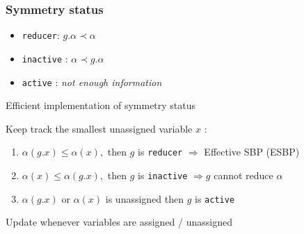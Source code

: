 \documentclass{beamer}
\begin{document}
\begin{frame}
\frametitle{Symmetry status}

\begin{itemize}
	\item \texttt{reducer}: $g.\alpha \prec \alpha$
	\item \texttt{inactive} : $\alpha \prec g.\alpha$
	\item \texttt{active} : \textit{not enough information}
\end{itemize}

\vfill

\begin{block}{Efficient implementation of symmetry status}

\centering 	Keep track the smallest unassigned variable $x$ :

\vspace{1em}

	\begin{enumerate}
		\item $\alpha(g.x) \leq \alpha(x),$ \small then $g$ is \texttt{reducer}
		$\Rightarrow$ Effective SBP (ESBP)
		\item $ \alpha(x) \leq \alpha(g.x),$ then $g$ is \texttt{inactive}
		$\Rightarrow g$ cannot reduce $\alpha$
		\item $\alpha(g.x)$ or $\alpha(x)$ is unassigned then $g$ is
		\texttt{active}
	\end{enumerate}
\end{block}  
\vspace{2em}

\centering Update whenever variables are assigned / unassigned
\end{frame}
\end{document}

